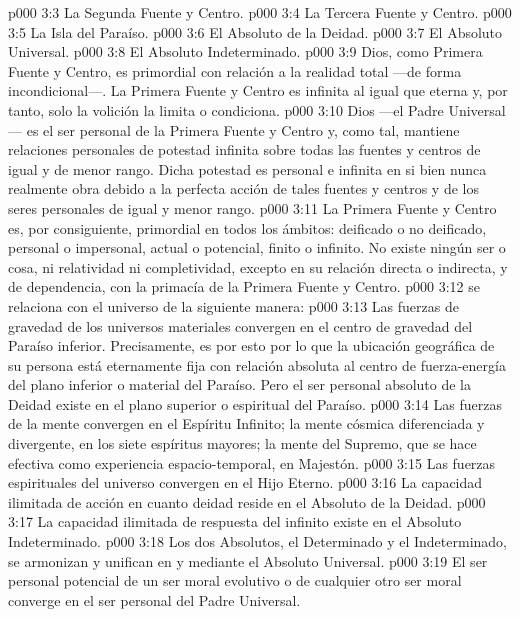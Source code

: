 \vs p000 3:3 La Segunda Fuente y Centro.
\vs p000 3:4 La Tercera Fuente y Centro.
\vs p000 3:5 La Isla del Paraíso.
\vs p000 3:6 El Absoluto de la Deidad.
\vs p000 3:7 El Absoluto Universal.
\vs p000 3:8 El Absoluto Indeterminado.
\vs p000 3:9 \pc Dios, como Primera Fuente y Centro, es primordial con relación a la realidad total ---de forma incondicional---. La Primera Fuente y Centro es infinita al igual que eterna y, por tanto, solo la volición la limita o condiciona.
\vs p000 3:10 Dios ---el Padre Universal--- es el ser personal de la Primera Fuente y Centro y, como tal, mantiene relaciones personales de potestad infinita sobre todas las fuentes y centros de igual y de menor rango. Dicha potestad es personal e infinita en  si bien nunca realmente obra debido a la perfecta acción de tales fuentes y centros y de los seres personales de igual y menor rango.
\vs p000 3:11 La Primera Fuente y Centro es, por consiguiente, primordial en todos los ámbitos: deificado o no deificado, personal o impersonal, actual o potencial, finito o infinito. No existe ningún ser o cosa, ni relatividad ni completividad, excepto en su relación directa o indirecta, y de dependencia, con la primacía de la Primera Fuente y Centro.
\vs p000 3:12 \pc {} se relaciona con el universo de la siguiente manera:
\vs p000 3:13 Las fuerzas de gravedad de los universos materiales convergen en el centro de gravedad del Paraíso inferior. Precisamente, es por esto por lo que la ubicación geográfica de su persona está eternamente fija con relación absoluta al centro de fuerza\hyp{}energía del plano inferior o material del Paraíso. Pero el ser personal absoluto de la Deidad existe en el plano superior o espiritual del Paraíso.
\vs p000 3:14 Las fuerzas de la mente convergen en el Espíritu Infinito; la mente cósmica diferenciada y divergente, en los siete espíritus mayores; la mente del Supremo, que se hace efectiva como experiencia espacio\hyp{}temporal, en Majestón.
\vs p000 3:15 Las fuerzas espirituales del universo convergen en el Hijo Eterno.
\vs p000 3:16 La capacidad ilimitada de acción en cuanto deidad reside en el Absoluto de la Deidad.
\vs p000 3:17 La capacidad ilimitada de respuesta del infinito existe en el Absoluto Indeterminado.
\vs p000 3:18 Los dos Absolutos, el Determinado y el Indeterminado, se armonizan y unifican en y mediante el Absoluto Universal.
\vs p000 3:19 El ser personal potencial de un ser moral evolutivo o de cualquier otro ser moral converge en el ser personal del Padre Universal.
